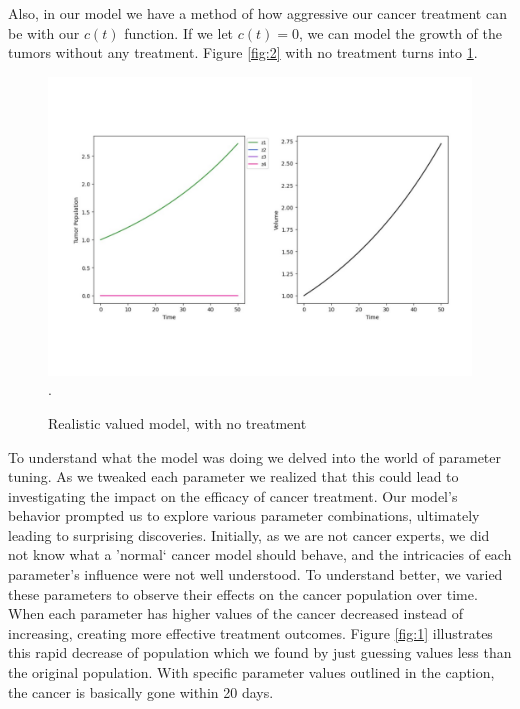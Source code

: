 \documentclass[11pt]{amsart}
\begin{document}
Also, in our model we have a method of how aggressive our cancer treatment can be with our $c(t)$ function. If we let $c(t)=0$, we can model the growth of the tumors without any treatment. Figure \ref{fig:2} with no treatment turns into \ref{fig:3}. 
\begin{figure}[h]
\begin{center} %
\includegraphics[width=\textwidth]{parameters_like_paper_no_treatment.pdf}. %
\end{center}
\caption{Realistic valued model, with no treatment}
\label{fig:3}
\end{figure}

To understand what the model was doing we delved into the world of parameter tuning. As we tweaked each parameter we realized that this could lead to investigating the impact on the efficacy of cancer treatment. Our model's behavior prompted us to explore various parameter combinations, ultimately leading to surprising discoveries. Initially, as we are not cancer experts, we did not know what a 'normal` cancer model should behave, and the intricacies of each parameter's influence were not well understood. To understand better, we varied these parameters to observe their effects on the cancer population over time. When each parameter has higher values of the cancer decreased instead of increasing, creating more effective treatment outcomes. Figure \ref{fig:1} illustrates this rapid decrease of population which we found by just guessing values less than the original population. With specific parameter values outlined in the caption, the cancer is basically gone within 20 days. 
\end{document}
